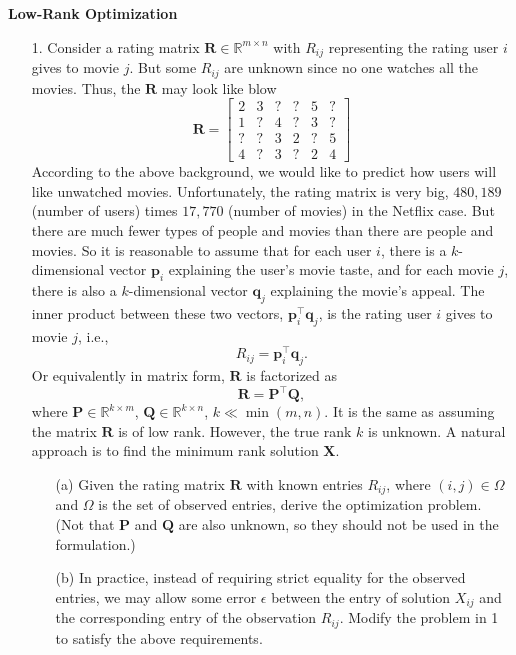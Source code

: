 \item[\uppercase\expandafter{\romannumeral3}.]\textbf{Low-Rank Optimization}
\begin{itemize}
\item[1.]
Consider a rating matrix $\mathbf{R} \in \mathbb{R}^{m \times n}$ with $R_{ij}$ representing the rating user $i$ gives to movie $j$. But some $R_{ij}$ are unknown since no one watches all the movies. Thus, the $\mathbf{R}$ may look like blow
\[
\mathbf{R} =
\begin{bmatrix}
2 & 3 & ? & ? & 5 & ? \\
1 & ? & 4 & ? & 3 &?\\
? & ? & 3 & 2 & ? & 5 \\
4 & ? & 3 & ? & 2 & 4
\end{bmatrix}
\]
According to the above background, we would like to predict how users will like unwatched movies. Unfortunately, the rating matrix is very big, $480,189$ (number of users) times $17,770$ (number of movies) in the Netflix case. But there are much fewer types of people and movies than there are people and movies. So it is reasonable to assume that for each user $i$, there is a $k$-dimensional vector $\mathbf{p}_i$ explaining the user's movie taste, and for each movie $j$, there is also a $k$-dimensional vector $\mathbf{q}_j$ explaining the movie's appeal. The inner product between these two vectors, $\mathbf{p}_i^\top \mathbf{q}_j$, is the rating user $i$ gives to movie $j$, i.e.,
    \[
    R_{ij} = \mathbf{p}_i^\top \mathbf{q}_j.
    \]
    Or equivalently in matrix form, $\mathbf{R}$ is factorized as
    \[
    \mathbf{R} = \mathbf{P}^\top \mathbf{Q},
    \]
    where $\mathbf{P} \in \mathbb{R}^{k \times m}$, $\mathbf{Q} \in \mathbb{R}^{k \times n}$, $k \ll \min(m, n)$. It is the same as assuming the matrix $\mathbf{R}$ is of low rank. However, the true rank $k$ is unknown. A natural approach is to find the minimum rank solution $\mathbf{X}$.
\begin{enumerate}
    \item[(a)] Given the rating matrix $\mathbf{R}$ with known entries $R_{ij}$, where $(i, j)\in\Omega$ and $\Omega$ is the set of observed entries, derive the optimization problem. (Not that $\mathbf{P}$ and $\mathbf{Q}$ are also unknown, so they should not be used in the formulation.)
    \item[(b)] In practice, instead of requiring strict equality for the observed entries, we may allow some error $\epsilon$ between the entry of solution $X_{ij}$ and the corresponding entry of the observation $R_{ij}$. Modify the problem in 1 to satisfy the above requirements.
\end{enumerate}


\end{itemize}
